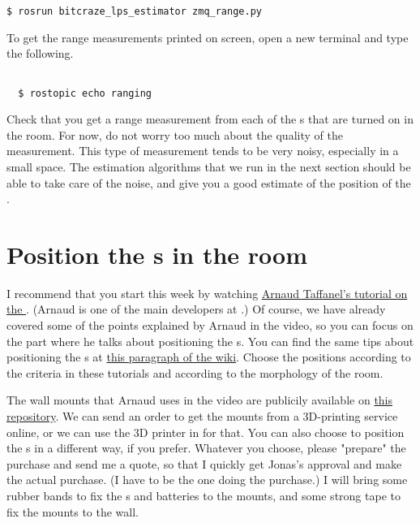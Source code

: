 \begin{Verbatim}[fontsize=\small]
  $ rosrun bitcraze_lps_estimator zmq_range.py
\end{Verbatim}

To get the range measurements printed on screen, open a new terminal and type the following.

\begin{Verbatim}[fontsize=\small]

  $ rostopic echo ranging

\end{Verbatim}

Check that you get a range measurement from each of the \LPN{}s that are turned on in the room.
For now, do not worry too much about the quality of the measurement.
This type of measurement tends to be very noisy, especially in a small space.
The estimation algorithms that we run in the next section should be able to take care of the noise, and give you a good estimate of the position of the \CF{}.







\section*{Position the \LPN{}s in the room}

I recommend that you start this week by watching \href{https://youtu.be/ZgH4bLZdq2A}{Arnaud Taffanel's tutorial on the \LPS}.
(Arnaud is one of the main developers at \Bitcraze.)
Of course, we have already covered some of the points explained by Arnaud in the video, so you can focus on the part where he talks about positioning the \LPN{}s.
You can find the same tips about positioning the \LPN{}s at \href{https://wiki.bitcraze.io/doc:lps:index#anchor_set-up}{this paragraph of the \Bitcraze{} wiki}.
Choose the positions according to the criteria in these tutorials and according to the morphology of the room.


The wall mounts that Arnaud uses in the video are publicily available on \href{https://github.com/bitcraze/bitcraze-mechanics/blob/master/LPS-anchor-stand/anchor-stand.stl}{this \Github{} repository}.
We can send an order to get the mounts from a 3D-printing service online, or we can use the 3D printer in \KTH{} for that.
You can also choose to position the \LPN{}s in a different way, if you prefer.
Whatever you choose, please "prepare" the purchase and send me a quote, so that I quickly get Jonas's approval and make the actual purchase.
(I have to be the one doing the purchase.)
I will bring some rubber bands to fix the \LPN{}s and batteries to the mounts, and some strong tape to fix the mounts to the wall.







